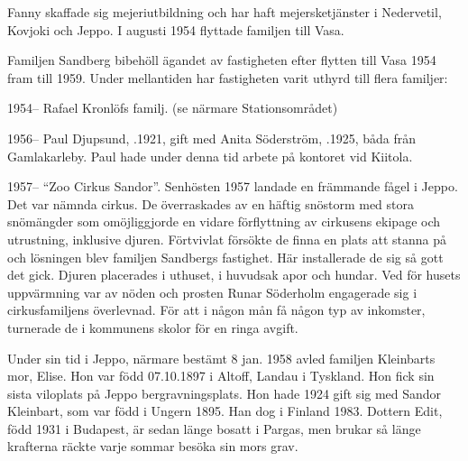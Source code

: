 Fanny skaffade sig mejeriutbildning och har haft mejersketjänster i Nedervetil, Kovjoki och Jeppo. I augusti 1954 flyttade familjen till Vasa.
\begin{jhchildren}
  \item {}
  \item {}
\end{jhchildren}
Familjen Sandberg bibehöll ägandet av fastigheten efter flytten till Vasa 1954 fram till 1959. Under mellantiden har fastigheten varit uthyrd till flera familjer:

1954--  Rafael Kronlöfs familj. (se närmare Stationsområdet)

1956--  Paul Djupsund, .1921, gift med Anita Söderström, .1925, båda från Gamlakarleby. Paul hade under denna tid arbete på kontoret vid Kiitola.
\begin{jhchildren}
  \item {}
  \item {}
  \item {}
\end{jhchildren}

1957--  ``Zoo Cirkus Sandor''. Senhösten 1957 landade en främmande fågel i Jeppo. Det var nämnda cirkus. De överraskades av en häftig snöstorm med stora snömängder som omöjliggjorde en vidare förflyttning av cirkusens ekipage och utrustning, inklusive djuren. Förtvivlat försökte de finna en plats att stanna på och lösningen blev familjen Sandbergs fastighet. Här installerade de sig så gott det gick. Djuren placerades i uthuset, i huvudsak apor och hundar. Ved för husets uppvärmning var av nöden och prosten Runar Söderholm engagerade sig i cirkusfamiljens överlevnad. För att i någon mån få någon typ av inkomster, turnerade de i kommunens skolor för en ringa avgift.

Under sin tid i Jeppo, närmare bestämt 8 jan. 1958 avled familjen Kleinbarts mor, Elise. Hon var född 07.10.1897 i Altoff, Landau i Tyskland. Hon fick sin sista viloplats på Jeppo bergravningsplats. Hon hade 1924 gift sig med Sandor Kleinbart, som var född i Ungern 1895. Han dog i Finland 1983. Dottern Edit, född 1931 i Budapest, är sedan länge bosatt i Pargas, men brukar så länge krafterna räckte varje sommar besöka sin mors grav.

